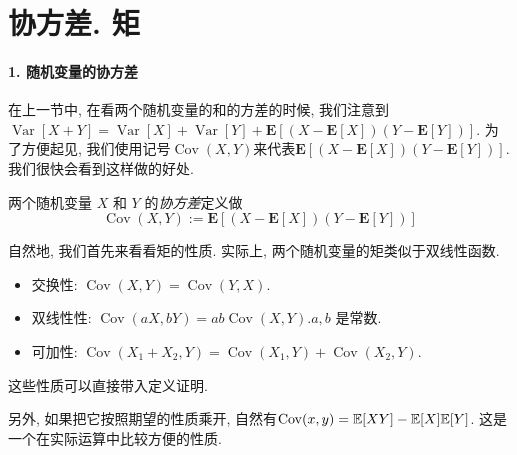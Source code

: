 \section{协方差. 矩}

\paragraph{1. 随机变量的协方差}在上一节中, 在看两个随机变量的和的方差的时候, 我们注意到$\operatorname{Var}[X+Y]=\operatorname{Var}[X]+\operatorname{Var}[Y]+\mathbf{E}[(X-\mathbf{E}[X])(Y-\mathbf{E}[Y])]$. 为了方便起见, 我们使用记号$\operatorname{Cov}(X, Y)$来代表$\mathbf{E}[(X-\mathbf{E}[X])(Y-\mathbf{E}[Y])]$. 我们很快会看到这样做的好处. 

\begin{definition}
    两个随机变量 $X$ 和 $Y$ 的\emph{协方差}定义做
$$
\operatorname{Cov}(X, Y):=\mathbf{E}[(X-\mathbf{E}[X])(Y-\mathbf{E}[Y])]
$$
\end{definition}

自然地, 我们首先来看看矩的性质. 实际上, 两个随机变量的矩类似于双线性函数. 

\begin{itemize}
    \item 交换性: $\operatorname{Cov}(X, Y)=\operatorname{Cov}(Y, X)$.
    \item 双线性性: $\operatorname{Cov}(a X, b Y)=a b \operatorname{Cov}(X, Y). a, b$ 是常数.
    \item 可加性: $\operatorname{Cov}\left(X_1+X_2, Y\right)=\operatorname{Cov}\left(X_1, Y\right)+\operatorname{Cov}\left(X_2, Y\right)$.
\end{itemize}

这些性质可以直接带入定义证明. 

另外, 如果把它按照期望的性质乘开, 自然有$\operatorname{Cov}(x,y)=\mathbb E[XY]-\mathbb E[X]\mathbb E[Y]$. 这是一个在实际运算中比较方便的性质. 

